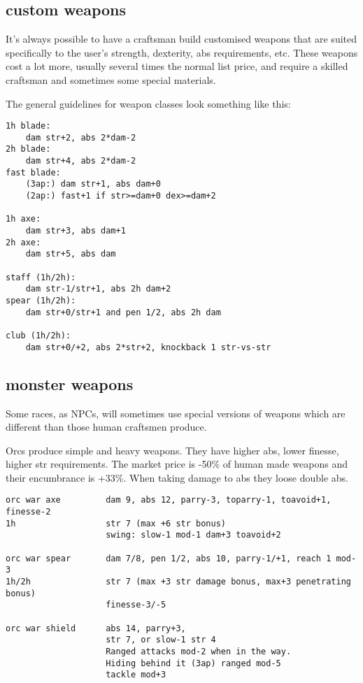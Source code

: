 \subsection*{custom weapons}
It's always possible to have a craftsman build customised weapons that are suited specifically to the user's strength, dexterity, abs requirements, etc. These weapons cost a lot more, usually several times the normal list price, and require a skilled craftsman and sometimes some special materials.

The general guidelines for weapon classes look something like this:\\
\small \begin{verbatim}
1h blade:
    dam str+2, abs 2*dam-2
2h blade:
    dam str+4, abs 2*dam-2
fast blade:
    (3ap:) dam str+1, abs dam+0
    (2ap:) fast+1 if str>=dam+0 dex>=dam+2

1h axe:
    dam str+3, abs dam+1
2h axe:
    dam str+5, abs dam

staff (1h/2h):
    dam str-1/str+1, abs 2h dam+2
spear (1h/2h):
    dam str+0/str+1 and pen 1/2, abs 2h dam

club (1h/2h):
    dam str+0/+2, abs 2*str+2, knockback 1 str-vs-str
\end{verbatim} \normalsize








\subsection*{monster weapons}
Some races, as NPCs, will sometimes use special versions of weapons which are different than those human craftsmen produce.

Orcs produce simple and heavy weapons. They have higher abs, lower finesse, higher str requirements. The market price is -50\% of human made weapons and their encumbrance is +33\%. When taking damage to abs they loose double abs.
\small \begin{verbatim}
orc war axe         dam 9, abs 12, parry-3, toparry-1, toavoid+1, finesse-2
1h                  str 7 (max +6 str bonus)
                    swing: slow-1 mod-1 dam+3 toavoid+2

orc war spear       dam 7/8, pen 1/2, abs 10, parry-1/+1, reach 1 mod-3
1h/2h               str 7 (max +3 str damage bonus, max+3 penetrating bonus)
                    finesse-3/-5

orc war shield      abs 14, parry+3,
                    str 7, or slow-1 str 4
                    Ranged attacks mod-2 when in the way.
                    Hiding behind it (3ap) ranged mod-5
                    tackle mod+3
\end{verbatim} \normalsize
\pagebreak[1]

